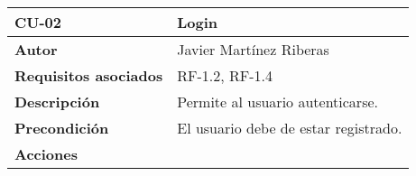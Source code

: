 \begin{longtable}[H]{@{}ll@{}}
\toprule
\begin{minipage}[b]{0.26\columnwidth}\raggedright\strut%
\textbf{CU-02}\strut
\end{minipage} & \begin{minipage}[b]{0.68\columnwidth}\raggedright\strut%
\textbf{Login}\strut
\end{minipage}\tabularnewline
\midrule
\endhead
\begin{minipage}[t]{0.26\columnwidth}\raggedright\strut
\textbf{Autor}\strut
\end{minipage} & \begin{minipage}[t]{0.68\columnwidth}\raggedright\strut
Javier Martínez Riberas\strut
\end{minipage}\tabularnewline
\begin{minipage}[t]{0.26\columnwidth}\raggedright\strut
\textbf{Requisitos asociados}\strut
\end{minipage} & \begin{minipage}[t]{0.68\columnwidth}\raggedright\strut%
RF-1.2, RF-1.4\strut
\end{minipage}\tabularnewline
\begin{minipage}[t]{0.26\columnwidth}\raggedright\strut
\textbf{Descripción}\strut
\end{minipage} & \begin{minipage}[t]{0.68\columnwidth}\raggedright\strut%
Permite al usuario autenticarse.\strut
\end{minipage}\tabularnewline
\begin{minipage}[t]{0.26\columnwidth}\raggedright\strut
\textbf{Precondición}\strut
\end{minipage} & \begin{minipage}[t]{0.68\columnwidth}\raggedright\strut%
El usuario debe de estar registrado.\strut
\end{minipage}\tabularnewline
\begin{minipage}[t]{0.26\columnwidth}\raggedright\strut
\textbf{Acciones}\strut
\end{minipage} & \begin{minipage}[t]{0.68\columnwidth}\raggedright\strut%

\end{minipage}
\end{longtable}
